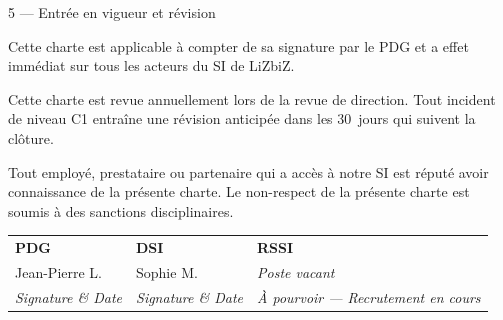 \documentclass[12pt,a4paper]{article}
\begin{document}
\begin{boxarticle}{5 --- Entrée en vigueur et révision}

Cette charte est applicable à compter de sa signature par le PDG et a
effet immédiat sur tous les acteurs du SI de LiZbiZ. 

Cette charte est
revue annuellement lors de la revue de direction.
Tout incident de niveau C1 entraîne une révision anticipée
dans les 30~jours qui suivent la clôture.

Tout employé, prestataire ou partenaire qui a accès à notre SI est réputé avoir connaissance de la présente charte. Le non-respect de la présente charte est soumis à des sanctions disciplinaires.

\vspace{1.2cm}

\begin{center}
\renewcommand{\arraystretch}{2.2}
\begin{tabularx}{0.94\textwidth}{
    >{\centering\arraybackslash}X
    >{\centering\arraybackslash}X
    >{\centering\arraybackslash}X}
\hline
\rowcolor{RACIPair}
\textbf{\color{ChartePrimaire}PDG} &
\textbf{\color{ChartePrimaire}DSI} &
\textbf{\color{ChartePrimaire}RSSI} \\
Jean-Pierre L. & Sophie M. & \textit{Poste vacant} \\
\hline
\rowcolor{CharteNeutFond}
\footnotesize\textit{Signature \& Date} &
\footnotesize\textit{Signature \& Date} &
\footnotesize\textit{À pourvoir --- Recrutement en cours} \\
\hline
\end{tabularx}
\end{center}

\end{boxarticle}

\vspace{0.6cm}

\end{document}
